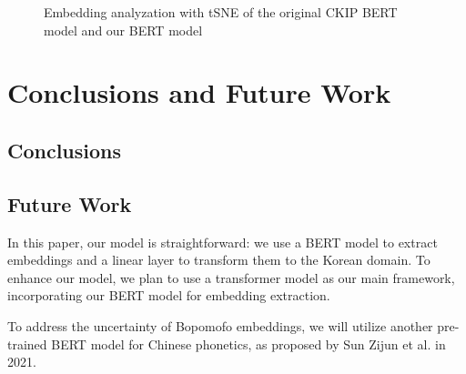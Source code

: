 \documentclass[PhD]{PHlab-thesis}
\begin{document}
\begin{figure}[h!]
  \centering
  \hfill
  \captionsetup{type=figure}
  \caption{Embedding analyzation with tSNE of the original CKIP BERT model and our BERT model}
  \label{fig:naver dictionary}
\end{figure}

\chapter{Conclusions and Future Work}
\section{Conclusions}

\section{Future Work}
In this paper, our model is straightforward: we use a BERT model to extract embeddings and a linear layer to transform them to the Korean domain. To enhance our model, we plan to use a transformer model as our main framework, incorporating our BERT model for embedding extraction.

To address the uncertainty of Bopomofo embeddings, we will utilize another pre-trained BERT model for Chinese phonetics, as proposed by Sun Zijun et al. in 2021.\cite{sun-etal-2021-chinesebert}

\newpage
{}
\printbibliography
\end{document}
